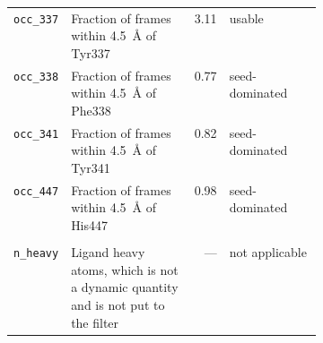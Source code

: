 \begin{tabular}{l>{\raggedright\arraybackslash}p{0.40\linewidth}rl}
\texttt{occ\_337} & Fraction of frames within \SI{4.5}{\angstrom} of Tyr337 & 3.11 & usable \\
\texttt{occ\_338} & Fraction of frames within \SI{4.5}{\angstrom} of Phe338 & 0.77 & seed-dominated \\
\texttt{occ\_341} & Fraction of frames within \SI{4.5}{\angstrom} of Tyr341 & 0.82 & seed-dominated \\
\texttt{occ\_447} & Fraction of frames within \SI{4.5}{\angstrom} of His447 & 0.98 & seed-dominated \\
\addlinespace
\multicolumn{4}{l}{\itshape Size covariate} \\
\addlinespace[2pt]
\texttt{n\_heavy} & Ligand heavy atoms, which is not a dynamic quantity and is not put to the filter & --- & not applicable \\
\bottomrule
\end{tabular}

